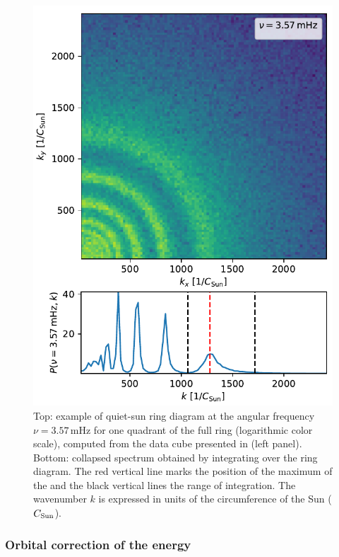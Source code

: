 \documentclass{aa}
\begin{document}
\begin{figure}\centering
	\includegraphics[width=1.0\linewidth]{ring_diagram_spectrum}
	\caption{Top: example of quiet-sun ring diagram at
	the angular frequency 
	$\nu=3.57$\,mHz 
	for one quadrant of the full ring (logarithmic color scale), computed from the data cube presented in  (left panel). 
	Bottom: collapsed spectrum obtained by 
	integrating over
	the ring diagram. The red vertical line marks the position of the maximum of the \fff and the black vertical lines the range of integration. The wavenumber $k$ is expressed in units of the circumference of the Sun ($C_{\rm Sun}$).}
	\label{ring_diagram}
\end{figure}

\subsubsection*{Orbital correction of the \fff{} 
energy}
\end{document}
